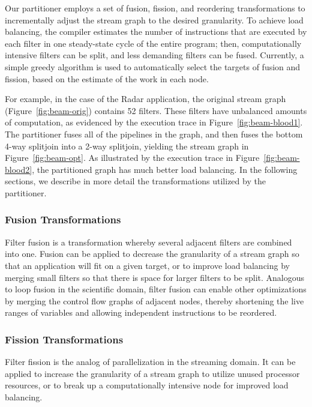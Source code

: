 Our partitioner employs a set of fusion, fission, and reordering
transformations to incrementally adjust the stream graph to the
desired granularity.  To achieve load balancing, the compiler
estimates the number of instructions that are executed by each filter
in one steady-state cycle of the entire program; then, computationally
intensive filters can be split, and less demanding filters can be
fused.  Currently, a simple greedy algorithm is used to automatically
select the targets of fusion and fission, based on the estimate of the
work in each node.

For example, in the case of the Radar application, the original
stream graph (Figure~\ref{fig:beam-orig}) contains 52 filters.  These
filters have unbalanced amounts of computation, as evidenced by the
execution trace in Figure~\ref{fig:beam-blood1}.  The partitioner
fuses all of the pipelines in the graph, and then fuses the bottom
4-way splitjoin into a 2-way splitjoin, yielding the stream graph in
Figure~\ref{fig:beam-opt}.  As illustrated by the execution trace in
Figure~\ref{fig:beam-blood2}, the partitioned graph has much better
load balancing.  In the following sections, we describe in more detail
the transformations utilized by the partitioner.


\subsubsection{Fusion Transformations}

Filter fusion is a transformation whereby several adjacent filters are
combined into one.  Fusion can be applied to decrease the granularity
of a stream graph so that an application will fit on a given target,
or to improve load balancing by merging small filters so that there is
space for larger filters to be split.  Analogous to loop fusion in the
scientific domain, filter fusion can enable other optimizations by
merging the control flow graphs of adjacent nodes, thereby shortening
the live ranges of variables and allowing independent instructions to
be reordered.



\subsubsection{Fission Transformations}

Filter fission is the analog of parallelization in the streaming
domain.  It can be applied to increase the granularity of a stream
graph to utilize unused processor resources, or to break up a
computationally intensive node for improved load balancing.



